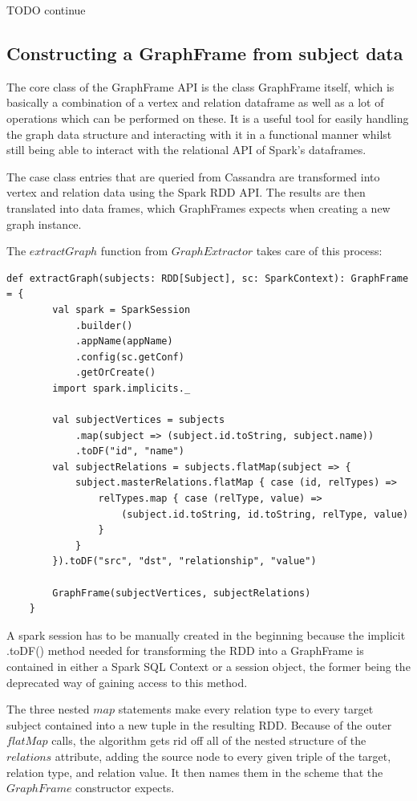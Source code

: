 \documentclass[
        a4paper,     %
        titlepage,   %
        oneside,     %
        parskip      %
        ]{scrartcl}  %
\begin{document}
    TODO continue

    \subsection{Constructing a GraphFrame from subject data}
    The core class of the GraphFrame API is the class GraphFrame itself, which
    is basically a combination of a vertex and relation dataframe as well as a
    lot of operations which can be performed on these. It is a useful tool for
    easily handling the graph data structure and interacting with it in a functional
    manner whilst still being able to interact with the relational API of Spark's dataframes.

    The case class entries that are queried from Cassandra are transformed into vertex
    and relation data using the Spark RDD API. The results are then translated into
    data frames, which GraphFrames expects when creating a new graph instance.

    The $extractGraph$ function from $GraphExtractor$ takes care of this process:

    \begin{lstlisting}[style=scalaStyle,caption=extractGraph in $GraphExtractor$]
    def extractGraph(subjects: RDD[Subject], sc: SparkContext): GraphFrame = {
  		val spark = SparkSession
  			.builder()
  			.appName(appName)
  			.config(sc.getConf)
  			.getOrCreate()
  		import spark.implicits._

  		val subjectVertices = subjects
  			.map(subject => (subject.id.toString, subject.name))
  			.toDF("id", "name")
  		val subjectRelations = subjects.flatMap(subject => {
  			subject.masterRelations.flatMap { case (id, relTypes) =>
  				relTypes.map { case (relType, value) =>
  					(subject.id.toString, id.toString, relType, value)
  				}
  			}
  		}).toDF("src", "dst", "relationship", "value")

  		GraphFrame(subjectVertices, subjectRelations)
  	}
    \end{lstlisting}

    A spark session has to be manually created in the beginning because the implicit .toDF() method
    needed for transforming the RDD into a GraphFrame is contained in either a
    Spark SQL Context or a session object, the former being the deprecated way of gaining access to this method.

    The three nested $map$ statements make every relation type to every target subject
    contained into a new tuple in the resulting RDD. Because of the outer $flatMap$
    calls, the algorithm gets rid off all of the nested structure of the $relations$
    attribute, adding the source node to every given triple of the target, relation type, and relation value.
    It then names them in the scheme that the $GraphFrame$ constructor expects.
    \pagebreak
\end{document}
